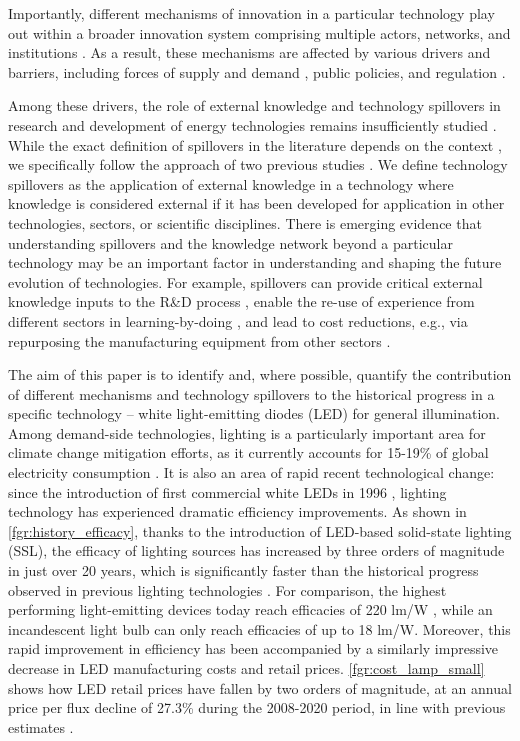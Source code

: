 \documentclass[parskip=full]{article}
\begin{document}
Importantly, different mechanisms of innovation in a particular technology play out within a broader innovation system comprising multiple actors, networks, and institutions \cite{grubler2012policies, Anadon2016}. As a result, these mechanisms are affected by various drivers and barriers, including forces of supply and demand \cite{Mowery1979}, public policies, and regulation \cite{anadon2009policy}.

Among these drivers, the role of external knowledge and technology spillovers in research and development of energy technologies remains insufficiently studied \cite{Stephan2021}. While the exact definition of spillovers in the literature depends on the context \cite{Nemet2012, kolesnikov2021spillovers}, we specifically follow the approach of two previous studies \cite{Stephan2021, kolesnikov2021spillovers}. We define technology spillovers as the application of external knowledge in a technology where knowledge is considered external if it has been developed for application in other technologies, sectors, or scientific disciplines. There is emerging evidence that understanding spillovers and the knowledge network beyond a particular technology may be an important factor in understanding \cite{Pichler2020, iea2020cleanenergy} and shaping \cite{Clark2016, Stephan2021} the future evolution of technologies. For example, spillovers can provide critical external knowledge inputs to the R\&D process \cite{kolesnikov2021spillovers}, enable the re-use of experience from different sectors in learning-by-doing \cite{iea2020cleanenergy}, and lead to cost reductions, e.g., via repurposing the manufacturing equipment from other sectors \cite{Stephan2021}.

The aim of this paper is to identify and, where possible, quantify the contribution of different mechanisms and technology spillovers to the historical progress in a specific technology – white light-emitting diodes (LED) for general illumination. Among demand-side technologies, lighting is a particularly important area for climate change mitigation efforts, as it currently accounts for 15-19\% of global electricity consumption \cite{Zissis2016,doe_electricity}. It is also an area of rapid recent technological change: since the introduction of first commercial white LEDs in 1996 \cite{Nakamura2013}, lighting technology has experienced dramatic efficiency improvements. As shown in \cref{fgr:history_efficacy}, thanks to the introduction of LED-based solid-state lighting (SSL), the efficacy of lighting sources has increased by three orders of magnitude in just over 20 years, which is significantly faster than the historical progress observed in previous lighting technologies \cite{weinold2021quantifying}. For comparison, the highest performing light-emitting devices today reach efficacies of 220 lm/W \cite{lumistrips2021mid}, while an incandescent light bulb can only reach efficacies of up to 18 lm/W. Moreover, this rapid improvement in efficiency has been accompanied by a similarly impressive decrease in LED manufacturing costs and retail prices. \cref{fgr:cost_lamp_small} shows how LED retail prices have fallen by two orders of magnitude, at an annual price per flux decline of 27.3\% during the 2008-2020 period, in line with previous estimates \cite{Gerke2020}.
\end{document}

